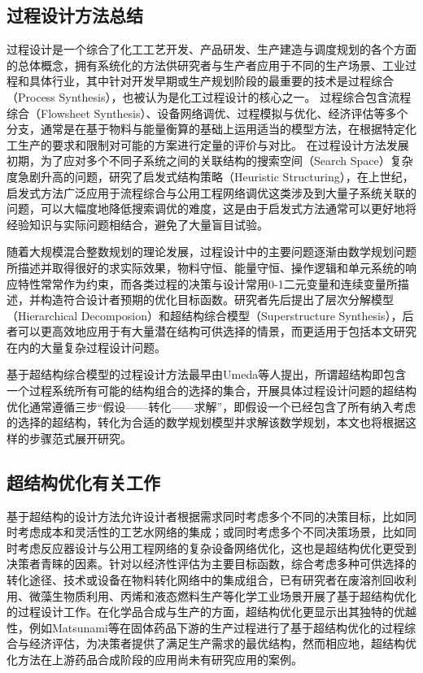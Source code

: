 \subsection{过程设计方法总结}
过程设计是一个综合了化工工艺开发、产品研发、生产建造与调度规划的各个方面的总体概念，拥有系统化的方法供研究者与生产者应用于不同的生产场景、工业过程和具体行业，其中针对开发早期或生产规划阶段的最重要的技术是过程综合（Process Synthesis），也被认为是化工过程设计的核心之一\cite{smith1995, barnicki2004}。
过程综合包含流程综合（Flowsheet Synthesis）、设备网络调优、过程模拟与优化、经济评估等多个分支，通常是在基于物料与能量衡算的基础上运用适当的模型方法，在根据特定化工生产的要求和限制对可能的方案进行定量的评价与对比\cite{osti_293030}。
在过程设计方法发展初期，为了应对多个不同子系统之间的关联结构的搜索空间（Search Space）复杂度急剧升高的问题，研究了启发式结构策略（Heuristic Structuring）\cite{masso1969}，在上世纪，启发式方法广泛应用于流程综合与公用工程网络调优这类涉及到大量子系统关联的问题\cite{papoulias1983,westerberg2004}，可以大幅度地降低搜索调优的难度，这是由于启发式方法通常可以更好地将经验知识与实际问题相结合，避免了大量盲目试验。

随着大规模混合整数规划的理论发展，过程设计中的主要问题逐渐由数学规划问题所描述并取得很好的求实际效果，物料守恒、能量守恒、操作逻辑和单元系统的响应特性常常作为约束，而各类过程的决策与设计常用0-1二元变量和连续变量所描述，并构造符合设计者预期的优化目标函数。研究者先后提出了层次分解模型（Hierarchical Decomposion）和超结构综合模型（Superstructure Synthesis），后者可以更高效地应用于有大量潜在结构可供选择的情景，而更适用于包括本文研究在内的大量复杂过程设计问题\cite{westerberg2004, mencarelli2020,ryu2020}。

基于超结构综合模型的过程设计方法最早由Umeda等人提出，所谓超结构即包含一个过程系统所有可能的结构组合的选择的集合，开展具体过程设计问题的超结构优化通常遵循三步“假设——转化——求解”，即假设一个已经包含了所有纳入考虑的选择的超结构，转化为合适的数学规划模型并求解该数学规划\cite{umeda1972}，本文也将根据这样的步骤范式展开研究。


\subsection{超结构优化有关工作}

基于超结构的设计方法允许设计者根据需求同时考虑多个不同的决策目标，比如同时考虑成本和灵活性的工艺水网络的集成\cite{ahmetovic2011}；或同时考虑多个不同决策场景，比如同时考虑反应器设计与公用工程网络的复杂设备网络优化\cite{madenoor2018}，这也是超结构优化更受到决策者青睐的因素。针对以经济性评估为主要目标函数，综合考虑多种可供选择的转化途径、技术或设备在物料转化网络中的集成组合，已有研究者在废溶剂回收利用\cite{chea2020}、微藻生物质利用\cite{gong2017}、丙烯和液态燃料生产\cite{yuan2016}等化学工业场景开展了基于超结构优化的过程设计工作。在化学品合成与生产的方面，超结构优化更显示出其独特的优越性，例如Matsunami等在固体药品下游的生产过程进行了基于超结构优化的过程综合与经济评估，为决策者提供了满足生产需求的最优结构\cite{matsunami2020}，然而相应地，超结构优化方法在上游药品合成阶段的应用尚未有研究应用的案例。

